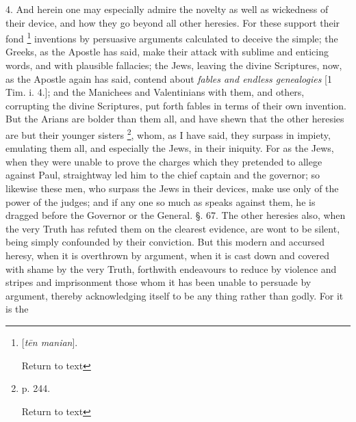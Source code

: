 4. And herein one may especially admire the
novelty as well as wickedness of their device, and how they go beyond
all other heresies. For these support their fond \footnote{[\emph{t\={e}n manian}].

Return to text} inventions
by persuasive arguments calculated to deceive the simple; the Greeks,
as the Apostle has said, make their attack with sublime and enticing
words, and with plausible fallacies; the Jews, leaving the divine
Scriptures, now, as the Apostle again has said, contend about \emph{fables
and endless genealogies} [1 Tim. i. 4.]; and the Manichees and
Valentinians with them, and others, corrupting the divine Scriptures,
put forth fables in terms of their own invention. But the Arians are
bolder than them all, and have shewn that the other heresies are but
their younger sisters \footnote{p. 244.

Return to text}, whom, as I have said, they surpass in
impiety, emulating them all, and especially the Jews, in their
iniquity. For as the Jews, when they were unable to prove the charges
which they pretended to allege against Paul, straightway led him to
the chief captain and the governor; so likewise these men, who surpass
the Jews in their devices, make use only of the power of the judges;
and if any one so much as speaks against them, he is dragged before
the Governor or the General. §. 67. The other heresies also, when the
very Truth has refuted them on the clearest evidence, are wont to be
silent, being simply confounded by their conviction. But this modern
and accursed heresy, when it is overthrown by argument, when it is
cast down and covered with shame by the very Truth, forthwith
endeavours to reduce by violence and stripes and imprisonment those whom it has been unable to persuade by argument, thereby
acknowledging itself to be any thing rather than godly. For it is the
